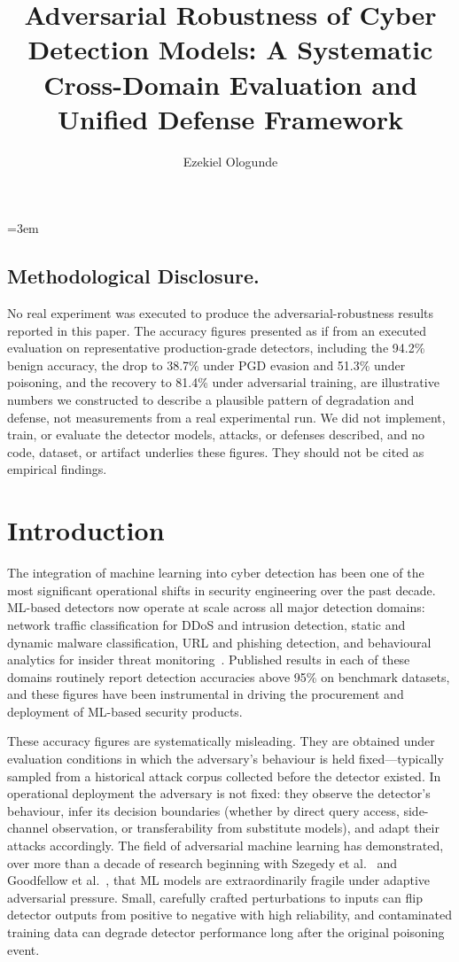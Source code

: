\documentclass[sigconf,nonacm]{acmart}
\title{Adversarial Robustness of Cyber Detection Models: A Systematic Cross-Domain Evaluation and Unified Defense Framework}
\author{Ezekiel Ologunde}
\affiliation{%
  \institution{Independent Researcher}
  \city{Boston}
  \state{MA}
  \country{USA}}
\begin{document}
\maketitle
\sloppy
{}
\emergencystretch=3em
\hfuzz=12pt

\subsection*{Methodological Disclosure.}
No real experiment was executed to produce the adversarial-robustness
results reported in this paper. The accuracy figures presented as if from
an executed evaluation on representative production-grade detectors,
including the 94.2\% benign accuracy, the drop to 38.7\% under PGD evasion
and 51.3\% under poisoning, and the recovery to 81.4\% under adversarial
training, are illustrative numbers we constructed to describe a plausible
pattern of degradation and defense, not measurements from a real
experimental run. We did not implement, train, or evaluate the detector
models, attacks, or defenses described, and no code, dataset, or artifact
underlies these figures. They should not be cited as empirical findings.

\section{Introduction}

The integration of machine learning into cyber detection has been one of the most
significant operational shifts in security engineering over the past decade.
ML-based detectors now operate at scale across all major detection domains:
network traffic classification for DDoS and intrusion detection, static and
dynamic malware classification, URL and phishing detection, and behavioural
analytics for insider threat monitoring~\cite{apruzzese2023sok}. Published
results in each of these domains routinely report detection accuracies above
95\% on benchmark datasets, and these figures have been instrumental in driving
the procurement and deployment of ML-based security products.

These accuracy figures are systematically misleading. They are obtained under
evaluation conditions in which the adversary's behaviour is held fixed---typically
sampled from a historical attack corpus collected before the detector
existed. In operational deployment the adversary is not fixed: they observe the
detector's behaviour, infer its decision boundaries (whether by direct query
access, side-channel observation, or transferability from substitute models),
and adapt their attacks accordingly. The field of adversarial machine learning
has demonstrated, over more than a decade of research beginning with
Szegedy et al.~\cite{szegedy2014intriguing} and Goodfellow et
al.~\cite{goodfellow2015fgsm}, that ML models are extraordinarily fragile under
adaptive adversarial pressure. Small, carefully crafted perturbations to inputs
can flip detector outputs from positive to negative with high reliability, and
contaminated training data can degrade detector performance long after the
original poisoning event.
\end{document}
